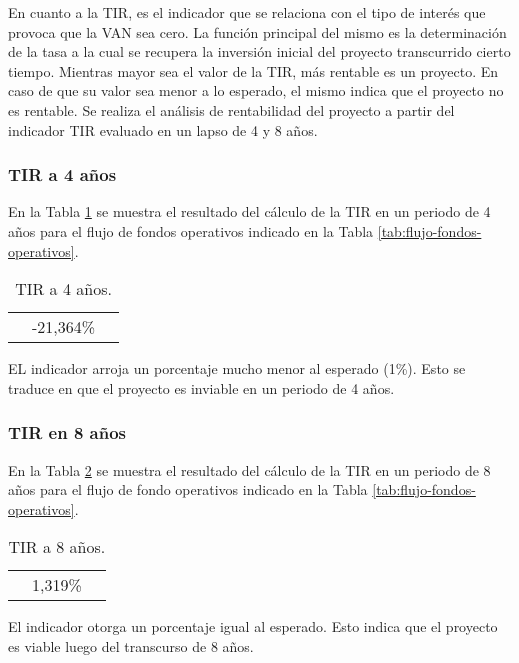 En cuanto a la TIR, es el indicador que se relaciona con el tipo de interés que provoca que la VAN sea cero. La función principal del mismo es la determinación de la tasa a la cual se recupera la inversión inicial del proyecto transcurrido cierto tiempo. Mientras mayor sea el valor de la TIR, más rentable es un proyecto. En caso de que su valor sea menor a lo esperado, el mismo indica que el proyecto no es rentable. Se realiza el análisis de rentabilidad del proyecto a partir del indicador TIR evaluado en un lapso de 4 y 8 años.

\subsubsection{TIR a 4 años}

En la Tabla \ref{tab:tir-4} se muestra el resultado del cálculo de la TIR en un periodo de 4 años para el flujo de fondos operativos indicado en la Tabla \ref{tab:flujo-fondos-operativos}.

\begin{table}[H]
  \centering
    \begin{tabular}{|cc|r|}
    \rowcolor[rgb]{ .773,  .851,  .945} \multicolumn{3}{c}{\textbf{a 4 años}} \bigstrut[b]\\
    \hline
    \rowcolor[rgb]{ .773,  .851,  .945} \multicolumn{2}{|c|}{\textbf{TIR}} & \cellcolor[rgb]{ 1,  1,  1}-21,364\% \bigstrut\\
    \hline
    \end{tabular}%
  \caption{TIR a 4 años.}    
  \label{tab:tir-4}%
\end{table}%


EL indicador arroja un porcentaje mucho menor al esperado (1\%). Esto se traduce en que el proyecto es inviable en un periodo de 4 años.

\subsubsection{TIR en 8 años}

En la Tabla \ref{tab:tir-8} se muestra el resultado del cálculo de la TIR en un periodo de 8 años para el flujo de fondo operativos indicado en la Tabla \ref{tab:flujo-fondos-operativos}.

\begin{table}[H]
  \centering
    \begin{tabular}{|cc|r|}
    \rowcolor[rgb]{ .773,  .851,  .945} \multicolumn{3}{c}{\textbf{a 8 años}} \bigstrut[b]\\
    \hline
    \rowcolor[rgb]{ .773,  .851,  .945} \multicolumn{2}{|c|}{\textbf{TIR}} & \cellcolor[rgb]{ 1,  1,  1}1,319\% \bigstrut\\
    \hline
    \end{tabular}%
  \caption{TIR a 8 años.}    
  \label{tab:tir-8}%
\end{table}%


El indicador otorga un porcentaje igual al esperado. Esto indica que el proyecto es viable luego del transcurso de 8 años.